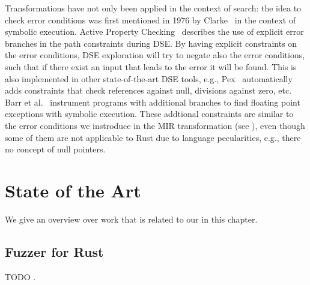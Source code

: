 \documentclass[paper=a4,%
  twoside,%
  BCOR4mm,%
  abstract=true,%
  toc=bibliography,%
  chapterprefix=true,%
  toc=bibliographynumbered,%
  open=right,%
  english,%
  pagesize=pdftex]{scrreprt}
\begin{document}

Transformations have not only been applied in the context of search: the idea to check error conditions was first mentioned in 1976 by Clarke~\cite{Clarke1976} in the context of symbolic execution. Active Property Checking~\cite{Godefroid_2005} describes the use of explicit error branches in the path constraints during \ac{DSE}. By having explicit constraints on the error conditions, \ac{DSE} exploration will try to negate also the error conditions, such that if there exist an input that leads to the error it will be found. This is also implemented in other state-of-the-art \ac{DSE} tools, e.g., Pex~\cite{Tillmann2008} automatically adds constraints that check references against null, divisions against zero, etc. Barr et al.~\cite{Barr2013} instrument programs with additional branches to find floating point exceptions with symbolic execution. These addtional constraints are similar to the error conditions we instroduce in the \ac{MIR} transformation (see ), even though some of them are not applicable to Rust due to language pecularities, e.g., there no concept of null pointers.

\clearpage
\chapter{State of the Art}
\label{chap:state-of-the-art}
We give an overview over work that is related to our in this chapter. 

\section{Fuzzer for Rust}
TODO \cite{Campos2017a}.
\end{document}
